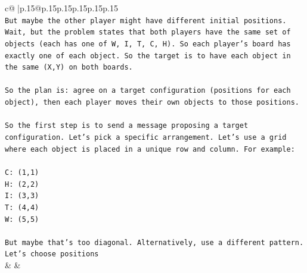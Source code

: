 \documentclass{article}
\begin{document}
{\begin{supertabular}{c@{$\;$}|p{.15\linewidth}@{}p{.15\linewidth}p{.15\linewidth}p{.15\linewidth}p{.15\linewidth}p{.15\linewidth}}
{{{\\ 
\texttt{But maybe the other player might have different initial positions. Wait, but the problem states that both players have the same set of objects (each has one of W, I, T, C, H). So each player's board has exactly one of each object. So the target is to have each object in the same (X,Y) on both boards.} \\
\\ 
\texttt{So the plan is: agree on a target configuration (positions for each object), then each player moves their own objects to those positions.} \\
\\ 
\texttt{So the first step is to send a message proposing a target configuration. Let's pick a specific arrangement. Let's use a grid where each object is placed in a unique row and column. For example:} \\
\\ 
\texttt{C: (1,1)} \\
\texttt{H: (2,2)} \\
\texttt{I: (3,3)} \\
\texttt{T: (4,4)} \\
\texttt{W: (5,5)} \\
\\ 
\texttt{But maybe that's too diagonal. Alternatively, use a different pattern. Let's choose positions} \\
            }
        }
    }
    & & \\ \\


\end{supertabular}}
\end{document}
